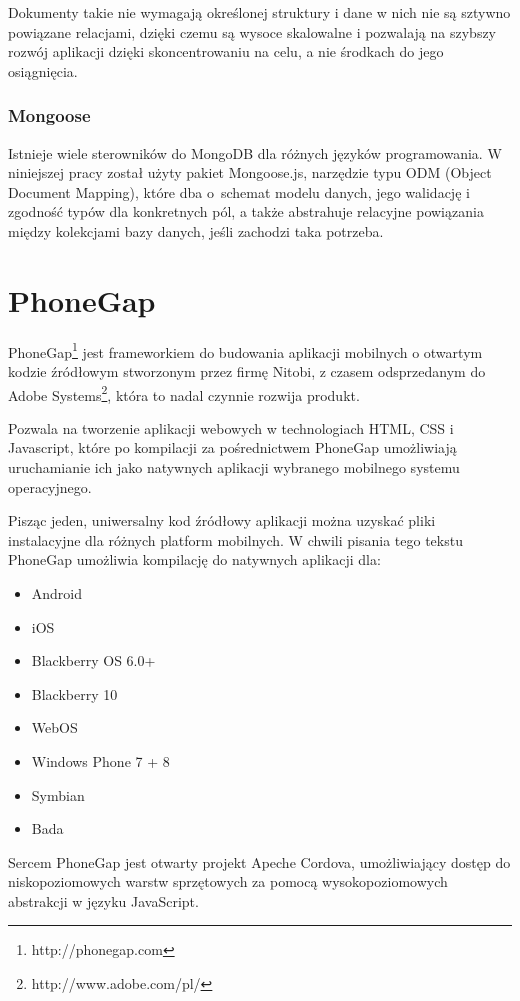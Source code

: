 \documentclass[twoside,a4paper,openright,12pt]{book}
\begin{document}
Dokumenty takie nie wymagają określonej struktury i dane w nich nie są sztywno powiązane relacjami, dzięki czemu są wysoce skalowalne i pozwalają na szybszy rozwój aplikacji dzięki skoncentrowaniu na celu, a nie środkach do jego osiągnięcia.

\subsubsection{Mongoose}

Istnieje wiele sterowników do MongoDB dla różnych języków programowania. W niniejszej pracy został użyty pakiet Mongoose.js, narzędzie typu ODM (Object Document Mapping), które dba o~schemat modelu danych, jego walidację i zgodność typów dla konkretnych pól, a także abstrahuje relacyjne powiązania między kolekcjami bazy danych, jeśli zachodzi taka potrzeba.


\section{PhoneGap}

PhoneGap\footnote{http://phonegap.com} jest frameworkiem do budowania aplikacji mobilnych o otwartym kodzie źródłowym stworzonym przez firmę Nitobi, z czasem odsprzedanym do Adobe Systems\footnote{http://www.adobe.com/pl/}, która to nadal czynnie rozwija produkt.

Pozwala na tworzenie aplikacji webowych w technologiach HTML, CSS i Javascript, które po kompilacji za pośrednictwem PhoneGap umożliwiają uruchamianie ich jako natywnych aplikacji wybranego mobilnego systemu operacyjnego. 

Pisząc jeden, uniwersalny kod źródłowy aplikacji można uzyskać pliki instalacyjne dla różnych platform mobilnych. W chwili pisania tego tekstu PhoneGap umożliwia kompilację do natywnych aplikacji dla:
\begin{itemize}
	\item Android
	\item iOS
	\item Blackberry OS 6.0+
	\item Blackberry 10
	\item WebOS
	\item Windows Phone 7 + 8
	\item Symbian
	\item Bada
\end{itemize}

Sercem PhoneGap jest otwarty projekt Apeche Cordova, umożliwiający dostęp do niskopoziomowych warstw sprzętowych za pomocą wysokopoziomowych abstrakcji w języku JavaScript. 
\end{document}
